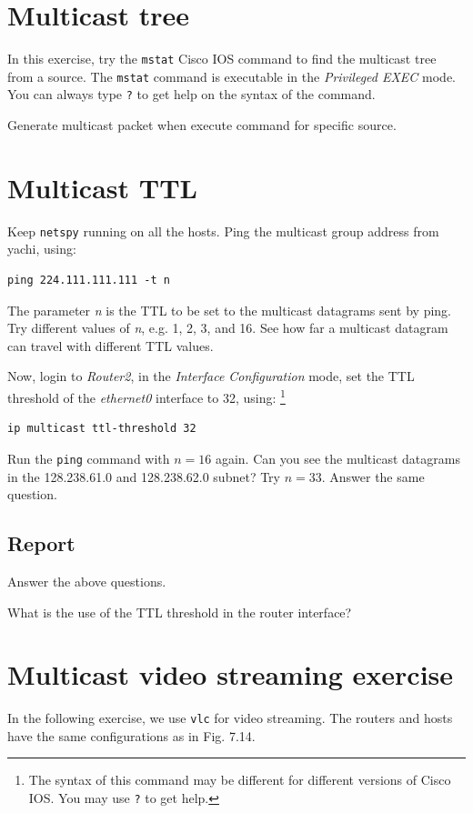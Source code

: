 \documentclass{../UTNetLab}
\begin{document}
\section{Multicast tree}
    In this exercise, try the \lstinline[language={cisco}]{mstat} Cisco IOS command to find the multicast tree from a source.
    The \lstinline[language={cisco}]{mstat} command is executable in the \textit{Privileged EXEC} mode.
    You can always type \lstinline[language={cisco}]{?} to get help on the syntax of the command.

    Generate multicast packet when execute command for specific source.

\section{Multicast TTL}
    Keep \lstinline{netspy} running on all the hosts.
    Ping the multicast group address from yachi, using: 
    \begin{lstlisting}[emph={n}]
ping 224.111.111.111 -t n
    \end{lstlisting}

    The parameter \textit{n} is the TTL to be set to the multicast datagrams sent by ping.
    Try different values of \textit{n}, e.g. 1, 2, 3, and 16.
    See how far a multicast datagram can travel with different TTL values. 

    Now, login to \textit{Router2}, in the \textit{Interface Configuration} mode, set the TTL threshold of the \textit{ethernet0} interface to 32, using: 
    \footnote{The syntax of this command may be different for different versions of Cisco IOS. You may use \lstinline[language={cisco}]{?} to get help.}
    \begin{lstlisting}[language={cisco}]    
ip multicast ttl-threshold 32
    \end{lstlisting}

    Run the \lstinline{ping} command with $n = 16$ again.
    Can you see the multicast datagrams in the 128.238.61.0 and 128.238.62.0 subnet?
    Try $n = 33$.
    Answer the same question.
    
    \subsection*{Report}
    Answer the above questions. 

    What is the use of the TTL threshold in the router interface?

\section*{Multicast video streaming exercise}
    In the following exercise, we use \lstinline{vlc} for video streaming.
    The routers and hosts have the same configurations as in Fig. 7.14.
\end{document}

